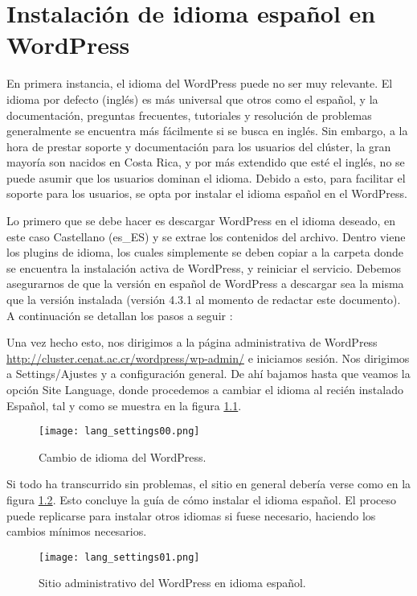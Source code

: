 \chapter{Instalación de idioma español en WordPress}
En primera instancia, el idioma del WordPress puede no ser muy relevante. El idioma por defecto (inglés) es más universal que otros  como el español, y la  documentación, preguntas frecuentes, tutoriales y resolución de problemas generalmente se encuentra más fácilmente si se busca en inglés. Sin embargo, a la hora de prestar soporte y documentación para los usuarios del clúster, la gran mayoría son nacidos en Costa Rica, y por más extendido que esté el inglés, no se puede asumir que los usuarios dominan el idioma. Debido a esto, para facilitar el soporte para los usuarios, se opta por instalar el idioma español en el WordPress.

Lo primero que se debe hacer es descargar WordPress en el idioma deseado, en este caso Castellano (es\_ES) y se extrae los contenidos del archivo. Dentro viene los plugins de idioma, los cuales simplemente se deben copiar a la carpeta donde se encuentra la instalación activa de WordPress, y reiniciar el servicio. Debemos asegurarnos de  que la versión en español de WordPress a descargar sea la misma que la versión instalada (versión 4.3.1 al momento de redactar este documento). A continuación se detallan los pasos a seguir \cite{wplang}:

Una vez hecho esto, nos dirigimos a la página administrativa de WordPress \url{http://cluster.cenat.ac.cr/wordpress/wp-admin/} e iniciamos sesión. Nos dirigimos a Settings/Ajustes y a configuración general. De ahí bajamos hasta que veamos la opción Site Language, donde procedemos a cambiar el idioma al recién instalado Español,  tal y como se muestra en la figura \ref{fig:lang:01}.
\begin{figure}[H]
\centering
\texttt{[image: lang\_settings00.png]}
\caption{Cambio de idioma del WordPress.}
\label{fig:lang:01}
\end{figure}
Si todo ha  transcurrido sin problemas, el sitio en general debería verse como en la figura \ref{fig:lang:02}. Esto concluye la guía de cómo instalar el idioma español. El proceso puede replicarse  para  instalar otros idiomas si fuese necesario, haciendo los cambios mínimos necesarios.
\begin{figure}[H]
\centering
\texttt{[image: lang\_settings01.png]}
\caption{Sitio administrativo del WordPress en idioma español.}
\label{fig:lang:02}
\end{figure}
\clearpage